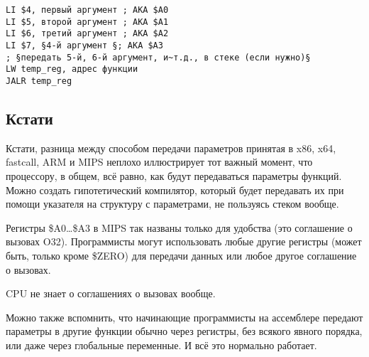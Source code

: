 \begin{lstlisting}[caption=MIPS (соглашение о вызовах O32),style=customasmMIPS]
LI $4, первый аргумент ; AKA $A0
LI $5, второй аргумент ; AKA $A1
LI $6, третий аргумент ; AKA $A2
LI $7, §4-й аргумент §; AKA $A3
; §передать 5-й, 6-й аргумент, и~т.д., в стеке (если нужно)§
LW temp_reg, адрес функции
JALR temp_reg
\end{lstlisting}

\subsection{Кстати}

Кстати, разница между способом передачи параметров принятая в x86, x64, fastcall, ARM и MIPS неплохо иллюстрирует тот важный момент, что процессору, в общем, всё равно, как будут 
передаваться параметры функций. Можно создать гипотетический компилятор, который будет передавать их при 
помощи указателя на структуру с параметрами, не пользуясь стеком вообще.

Регистры \$A0\dots \$A3 в MIPS так названы только для удобства (это соглашение о вызовах O32).
Программисты могут использовать любые другие регистры (может быть, только кроме \$ZERO) для
передачи данных или любое другое соглашение о вызовах.

\ac{CPU} не знает о соглашениях о вызовах вообще.

Можно также вспомнить, что начинающие программисты на ассемблере передают параметры 
в другие функции обычно через регистры, без всякого явного порядка, или даже через глобальные переменные.
И всё это нормально работает.

